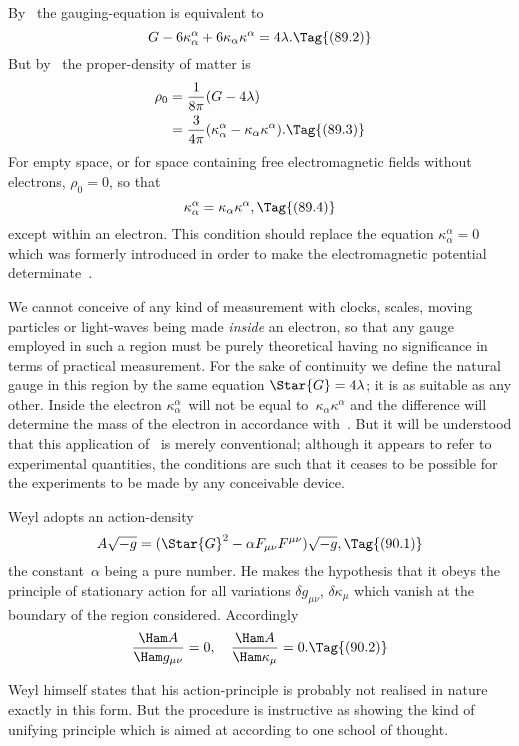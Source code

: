 \documentclass[12pt]{book}
\begin{document}
By~ the gauging-equation is equivalent to
\[
G - 6\kappa_{\alpha}^{\alpha} + 6\kappa_{\alpha} \kappa^{\alpha} = 4\lambda.
\Tag{(89.2)}
\]
But by~ the proper-density of matter is
\begin{align*}
  \rho_{0} &= \frac{1}{8\pi} (G - 4\lambda) \\
  &= \frac{3}{4\pi} (\kappa_{\alpha}^{\alpha} - \kappa_{\alpha} \kappa^{\alpha}).
  \Tag{(89.3)}
\end{align*}
For empty space, or for space containing free electromagnetic fields without
electrons, $\rho_{0} = 0$, so that
\[
\kappa_{\alpha}^{\alpha} = \kappa_{\alpha} \kappa^{\alpha},
\Tag{(89.4)}
\]
except within an electron. This condition should replace the equation $\kappa_{\alpha}^{\alpha} = 0$
which was formerly introduced in order to make the electromagnetic potential
determinate~.

We cannot conceive of any kind of measurement with clocks, scales,
moving particles or light-waves being made \emph{inside} an electron, so that any
gauge employed in such a region must be purely theoretical having no significance
in terms of practical measurement. For the sake of continuity we
define the natural gauge in this region by the same equation $\Star{G} = 4\lambda$; it is
as suitable as any other. Inside the electron $\kappa_{\alpha}^{\alpha}$~will not be equal to~$\kappa_{\alpha} \kappa^{\alpha}$ and
the difference will determine the mass of the electron in accordance with~.
But it will be understood that this application of~ is merely
conventional; although it appears to refer to experimental quantities, the
conditions are such that it ceases to be possible for the experiments to be
made by any conceivable device.

%
%
%

Weyl adopts an action-density
\[
A \sqrt{-g} = (\Star{G}^{2} - \alpha F_{\mu\nu} F^{\mu\nu}) \sqrt{-g},
\Tag{(90.1)}
\]
the constant~$\alpha$ being a pure number. He makes the hypothesis that it obeys
the principle of stationary action for all variations $\delta g_{\mu\nu}$, $\delta\kappa_{\mu}$ which vanish at
the boundary of the region considered. Accordingly
\[
\frac{\Ham A}{\Ham g_{\mu\nu}} = 0,\quad
\frac{\Ham A}{\Ham \kappa_{\mu}} = 0.
\Tag{(90.2)}
\]

Weyl himself states that his action-principle is probably not realised in
nature exactly in this form. But the procedure is instructive as showing the
kind of unifying principle which is aimed at according to one school of
thought.
\end{document}

